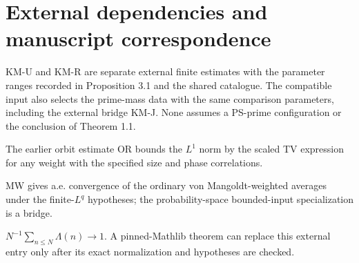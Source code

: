 \section*{External dependencies and manuscript correspondence}
\begin{inputthm}\label{input:KM}
KM-U and KM-R are separate external finite estimates with the parameter ranges recorded in Proposition 3.1 and the shared catalogue. The compatible input also selects the prime-mass data with the same comparison parameters, including the external bridge KM-J. None assumes a PS-prime configuration or the conclusion of Theorem 1.1.
\end{inputthm}
\begin{inputthm}\label{input:OR}
The earlier orbit estimate OR bounds the $L^1$ norm by the scaled TV expression for any weight with the specified size and phase correlations.
\end{inputthm}
\begin{inputthm}\label{input:MW}
MW gives a.e. convergence of the ordinary von Mangoldt-weighted averages under the finite-$L^q$ hypotheses; the probability-space bounded-input specialization is a bridge.
\end{inputthm}
\begin{inputthm}\label{input:PNT}
$N^{-1}\sum_{n\leq N}\Lambda(n)\to1$. A pinned-Mathlib theorem can replace this external entry only after its exact normalization and hypotheses are checked.
\end{inputthm}

\ifDetailed\else\small\fi


\normalsize

